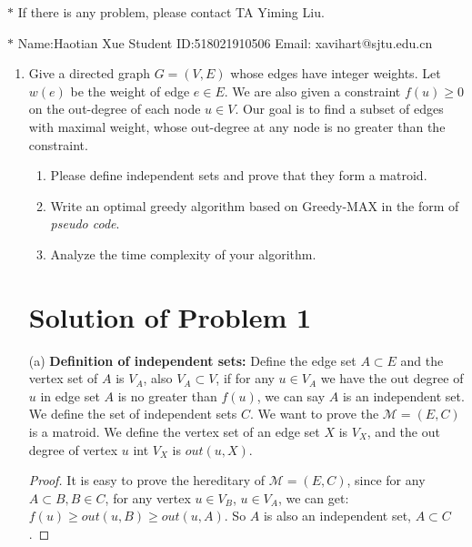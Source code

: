 \documentclass[12pt,a4paper]{article}
\theoremstyle{definition}
\begin{document}
\renewcommand\tablename{Table}
\noindent

\noindent{}
\begin{center}
\footnotesize{\color{red}$*$ If there is any problem, please contact TA Yiming Liu.}

\footnotesize{\color{blue}$*$ Name:Haotian Xue  \quad Student ID:518021910506 \quad Email: xavihart@sjtu.edu.cn}
\end{center}

\begin{enumerate}
\item Give a directed graph $G=(V,E)$ whose edges have integer weights. Let $w(e)$ be the weight of edge $e\in E$. We are also given a constraint $f(u)\geq 0$ on the out-degree of each node $u\in V$. Our goal is to find a subset of edges with maximal weight, whose out-degree at any node is no greater than the constraint.
	\begin{enumerate}
	    \item Please define independent sets and prove that they form a matroid.
	    \item Write an optimal greedy algorithm based on Greedy-MAX in the form of \emph{pseudo code}.
	    \item Analyze the time complexity of your algorithm.
	\end{enumerate}


\section*{Solution of Problem 1}

	(a) \textbf{Definition of independent sets:} Define the edge set $A \subset E$ and the vertex set of $A$ is $V_A$, also $V_A \subset V$, 
	if for any $u \in V_A$ we have the out degree of $u$ in edge set $A$ is no greater than $f(u)$, we can say $A$ is an independent set. 	
	We define the set of independent sets $C$. We want to prove the $\mathcal{M} = (E, C)$ is a matroid. We define the vertex set of an edge set $X$ is $V_X$, and 
	the out degree of vertex $u$ int $V_X$ is $out(u, X)$. 
	\begin{proof}
		It is easy to prove the hereditary of $\mathcal{M}=(E, C)$, since for any $A \subset B, B \in C$, for any vertex $u \in V_B$, $u \in V_A$, we can get:
		$f(u) \geq out(u, B) \geq out(u, A)$. So $A$ is also an independent set, $A \subset C$.


\end{proof}
\end{enumerate}
\end{document}

